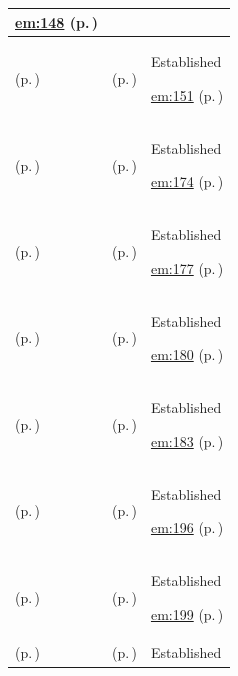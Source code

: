 \begin{longtable}{|>{\raggedright\arraybackslash}p{0.27\TableWidth}|>{\raggedright\arraybackslash}p{0.27\TableWidth}|>{\raggedright\arraybackslash}p{0.46\TableWidth}|}
 \hyperref[rad:em:140]{em:148} (p.\,\pageref{rad:em:140})\\\hline
\nameref{function:maintain-care-place-definition} (p.\,\pageref{function:maintain-care-place-definition}) & \nameref{feature:feat-em-23} (p.\,\pageref{feature:feat-em-23}) & Established

 \hyperref[rad:em:140]{em:151} (p.\,\pageref{rad:em:140})\\\hline
\nameref{function:maintain-healthcare-service-definition} (p.\,\pageref{function:maintain-healthcare-service-definition}) & \nameref{feature:feat-em-24} (p.\,\pageref{feature:feat-em-24}) & Established

 \hyperref[rad:em:161]{em:174} (p.\,\pageref{rad:em:161})\\\hline
\nameref{function:maintain-service-location-provider-map} (p.\,\pageref{function:maintain-service-location-provider-map}) & \nameref{feature:feat-em-25} (p.\,\pageref{feature:feat-em-25}) & Established

 \hyperref[rad:em:161]{em:177} (p.\,\pageref{rad:em:161})\\\hline
\nameref{function:maintain-service-availability} (p.\,\pageref{function:maintain-service-availability}) & \nameref{feature:feat-em-26} (p.\,\pageref{feature:feat-em-26}) & Established

 \hyperref[rad:em:161]{em:180} (p.\,\pageref{rad:em:161})\\\hline
\nameref{function:maintain-service-eligibility-rules} (p.\,\pageref{function:maintain-service-eligibility-rules}) & \nameref{feature:feat-em-27} (p.\,\pageref{feature:feat-em-27}) & Established

 \hyperref[rad:em:161]{em:183} (p.\,\pageref{rad:em:161})\\\hline
\nameref{function:maintain-device-definition} (p.\,\pageref{function:maintain-device-definition}) & \nameref{feature:feat-em-28} (p.\,\pageref{feature:feat-em-28}) & Established

 \hyperref[rad:em:193]{em:196} (p.\,\pageref{rad:em:193})\\\hline
\nameref{function:maintain-device-instance-identity} (p.\,\pageref{function:maintain-device-instance-identity}) & \nameref{feature:feat-em-29} (p.\,\pageref{feature:feat-em-29}) & Established

 \hyperref[rad:em:193]{em:199} (p.\,\pageref{rad:em:193})\\\hline
\nameref{function:maintain-device-association} (p.\,\pageref{function:maintain-device-association}) & \nameref{feature:feat-em-30} (p.\,\pageref{feature:feat-em-30}) & Established


\end{longtable}
